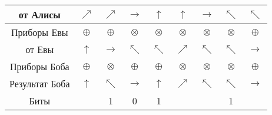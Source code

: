 \begin{tabular}{| c | c | c | c | c | c | c | c | c |}
    \hline
    от Алисы       & $\nearrow$ & $\nearrow$ & $\rightarrow$ & $\uparrow$ & $\uparrow$ & $\rightarrow$ & $\nwarrow$ & $\nwarrow$ \\
    \hline
    Приборы Евы    & $\oplus$ & $\oplus$ & $\otimes$ & $\otimes$ & $\otimes$ & $\otimes$ & $\otimes$ & $\oplus$ \\
    \hline
    от Евы         & $\uparrow$ & $\rightarrow$ & $\nwarrow$ & $\nwarrow$ & $\nearrow$ & $\nwarrow$ & $\nwarrow$ & $\rightarrow$ \\
    \hline
    Приборы Боба   & $\oplus$ & $\otimes$ & $\oplus$ & $\oplus$ & $\otimes$ & $\otimes$ & $\otimes$ & $\oplus$ \\
    \hline
    Результат Боба & $\uparrow$ & $\nwarrow$ & $\rightarrow$ & $\uparrow$ & $\nearrow$ & $\nwarrow$ & $\nwarrow$ & $\rightarrow$ \\
    \hline
    Биты           &  & 1 & 0 & 1 &  &  & 1 &  \\
    \hline
\end{tabular}

